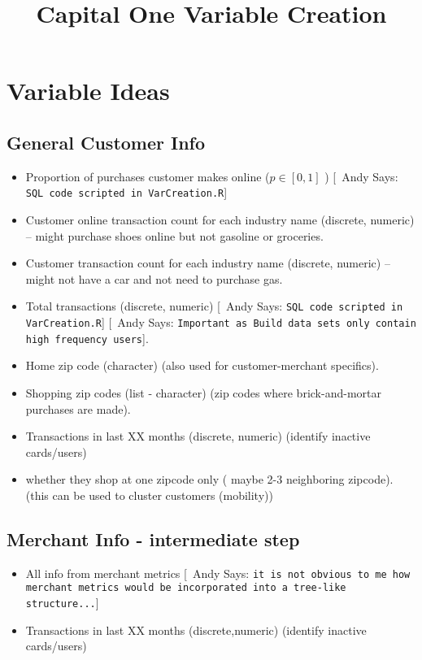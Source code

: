 \documentclass{article}
\begin{document}
  \title{\bf Capital One Variable Creation}

 \maketitle
\newcommand{\ac}[1]{[{\color{red}\ Andy Says: {\tt #1}}]}

\section{Variable Ideas}

\subsection{General Customer Info}
\begin{itemize} 
\item Proportion of purchases customer makes online ($p \in [0,1]$ ) \ac{SQL code scripted in VarCreation.R}
\item Customer online transaction count for each industry name (discrete, numeric) -- might purchase shoes online but not gasoline or groceries.
\item Customer transaction count for each industry name (discrete, numeric) -- might not have a car and not need to purchase gas.
\item Total transactions  (discrete, numeric) \ac{SQL code scripted in VarCreation.R}  \ac{Important as Build data sets only contain high frequency users}.
\item Home zip code (character) (also used for customer-merchant specifics).
\item Shopping zip codes (list - character) (zip codes where brick-and-mortar purchases are made).
\item Transactions in last XX months (discrete, numeric) (identify inactive cards/users)
\item whether they shop at one zipcode only ( maybe 2-3 neighboring zipcode). (this can be used to cluster customers (mobility))
\end{itemize}

\subsection{Merchant Info - intermediate step}
\begin{itemize}
\item All info from merchant metrics \ac{it is not obvious to me how merchant metrics would be incorporated into a tree-like structure...}
\item Transactions in last XX months (discrete,numeric) (identify inactive cards/users)
\end{itemize}
\end{document}
